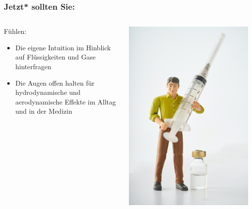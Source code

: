 \documentclass{beamer}
\begin{document}
\begin{frame}

\frametitle{Jetzt* sollten Sie:}
 

\begin{columns}[c]

\begin{column}{7cm}
\begin{block}{Fühlen:}

\begin{itemize}
\item
Die eigene Intuition im Hinblick auf Flüssigkeiten und Gase hinterfragen
\item
Die Augen offen halten für hydrodynamische und aerodynamische Effekte im Alltag und in der Medizin
\end{itemize}

\end{block}

\end{column}

\begin{column}{4cm}
\begin{center}
\includegraphics[width=\textwidth]{action_figure_needle.jpg}
\end{center}

\end{column}
\end{columns}



 \end{frame}
\end{document}
